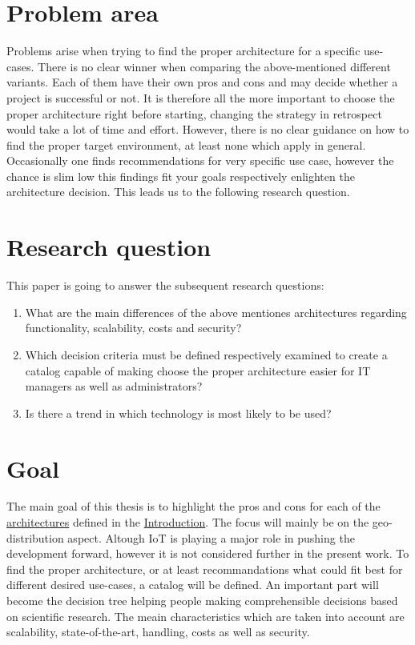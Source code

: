 \documentclass[MSC,Master,english]{twbook}%
\begin{document}
\section{Problem area}
Problems arise when trying to find the proper architecture for a specific use-cases. There is no clear winner when comparing the above-mentioned different variants. Each of them  have their own pros and cons and may decide whether a project is successful or not. It is therefore all the more important to choose the proper architecture right before starting, changing the strategy in retrospect would take a lot of time and effort. However, there is no clear guidance on how to find the proper target environment, at least none which apply in general. Occasionally one finds recommendations for very specific use case, however the chance is slim low this findings fit your goals respectively enlighten the architecture decision. This leads us to the following research question.

\section{Research question}
\label{sec:rq}
This paper is going to answer the subsequent research questions:
\begin{enumerate}
    \item What are the main differences of the above mentiones architectures regarding   functionality, scalability, costs and security?
    \item Which decision criteria must be defined respectively examined to create a catalog capable
    of making choose the proper architecture easier for \ac{IT} managers as well as administrators?
    \item Is there a trend in which technology is most likely to be used?
\end{enumerate}

\section{Goal}
\label{sec:goal}
The main goal of this thesis is to highlight the pros and cons for each of the \hyperref[item:architecture]{architectures} defined in the \hyperref[chap:introduction]{Introduction}. The focus will mainly be on the geo-distribution aspect. Altough \ac{IoT} is playing a major role in pushing the development forward, however it is not considered further in the present work. To find the proper architecture, or at least recommandations what could fit best for different desired use-cases, a catalog will be defined. An important part will become the decision tree helping people making comprehensible decisions based on scientific research. The meain characteristics which are taken into account are scalability, state-of-the-art, handling, costs as well as security.
\end{document}
